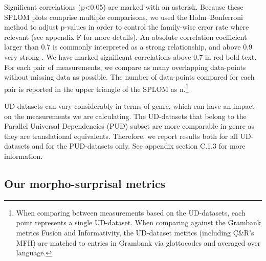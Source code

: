 \documentclass[USenglish]{article}
\begin{document}
Significant correlations (p<0.05) are marked with an asterisk. 
Because these SPLOM plots comprise multiple comparisons, we used the Holm–Bonferroni method \citep{holm_simple_1979} to adjust p-values in order to control the family-wise error rate where relevant (see appendix F
for more details).
An absolute correlation coefficient larger than 0.7 is commonly interpreted as a strong relationship, and above 0.9 very strong \citep{schober_correlation_2018}. 
We have marked significant correlations above 0.7 in red bold text.
For each pair of measurements, we compare as many overlapping data-points without missing data as possible.
The number of data-points compared for each pair is reported in the upper triangle of the SPLOM as n.\footnote{When comparing between measurements based on the UD-datasets, each point represents a single UD-dataset. When comparing against the Grambank metrics Fusion and Informativity, the UD-dataset metrics (including Ç\&R's MFH) are matched to entries in Grambank via glottocodes and averaged over language.}

UD-datasets can vary considerably in terms of genre, which can have an impact on the measurements we are calculating. 
The UD-datasets that belong to the Parallel Universal Dependencies (PUD) subset are more comparable in genre as they are translational equivalents. 
Therefore, we report results both for all UD-datasets and for the PUD-datasets only. 
See appendix section C.1.3
for more information.

\subsection{Our morpho-surprisal metrics}
\end{document}
